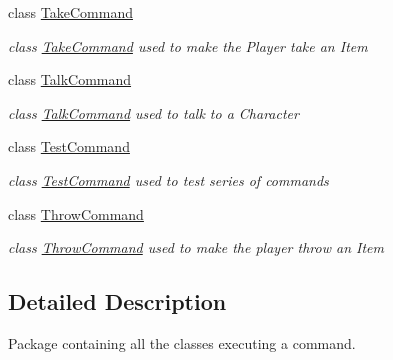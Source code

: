 \begin{DoxyCompactItemize}
class \hyperlink{classpkg__commands_1_1TakeCommand}{Take\-Command}
\begin{DoxyCompactList}\small\item\em class \hyperlink{classpkg__commands_1_1TakeCommand}{Take\-Command} used to make the Player take an Item \end{DoxyCompactList}\item 
class \hyperlink{classpkg__commands_1_1TalkCommand}{Talk\-Command}
\begin{DoxyCompactList}\small\item\em class \hyperlink{classpkg__commands_1_1TalkCommand}{Talk\-Command} used to talk to a Character \end{DoxyCompactList}\item 
class \hyperlink{classpkg__commands_1_1TestCommand}{Test\-Command}
\begin{DoxyCompactList}\small\item\em class \hyperlink{classpkg__commands_1_1TestCommand}{Test\-Command} used to test series of commands \end{DoxyCompactList}\item 
class \hyperlink{classpkg__commands_1_1ThrowCommand}{Throw\-Command}
\begin{DoxyCompactList}\small\item\em class \hyperlink{classpkg__commands_1_1ThrowCommand}{Throw\-Command} used to make the player throw an Item \end{DoxyCompactList}\end{DoxyCompactItemize}


\subsection{Detailed Description}
Package containing all the classes executing a command. 
